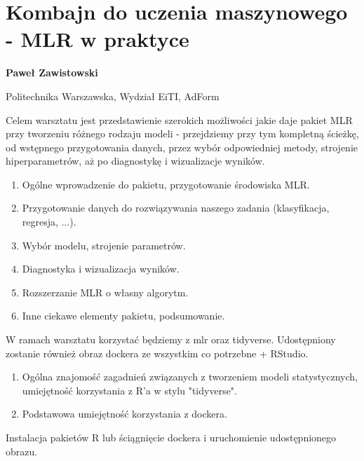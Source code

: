 \documentclass[\main/boa.tex]{subfiles}
\begin{document}
\section{Kombajn do uczenia maszynowego - MLR w praktyce}

\begin{minipage}{0.915\textwidth}
\centering
{\bf {} Paweł Zawistowski}
\end{minipage}

\vskip 0.3cm

\begin{affiliations}
\begin{minipage}{0.915\textwidth}
\centering
\large Politechnika Warszawska, Wydział EiTI, AdForm  \\[2pt]
\end{minipage}
\end{affiliations}

\vskip 0.8cm

\opiswarsztatu Celem warsztatu jest przedstawienie szerokich możliwości jakie daje pakiet MLR przy tworzeniu różnego rodzaju modeli - przejdziemy przy tym kompletną ścieżkę, od wstępnego przygotowania danych, przez wybór odpowiedniej metody, strojenie hiperparametrów, aż po diagnostykę i wizualizacje wyników.

\planwarsztatu
\begin{enumerate}
\item Ogólne wprowadzenie do pakietu, przygotowanie środowiska MLR.
\item Przygotowanie danych do rozwiązywania naszego zadania (klasyfikacja, regresja, ...).
\item Wybór modelu, strojenie parametrów.
\item Diagnostyka i wizualizacja wyników.
\item Rozszerzanie MLR o własny algorytm.
\item Inne ciekawe elementy pakietu, podsumowanie.
\end{enumerate}	 

\pakiety W ramach warsztatu korzystać będziemy z mlr oraz tidyverse. Udostępniony zostanie również obraz dockera ze wszystkim co potrzebne + RStudio.

\umiejetnosci\begin{enumerate}
	\item Ogólna znajomość zagadnień związanych z tworzeniem modeli statystycznych, umiejętność korzystania z R'a w stylu "tidyverse".
	\item Podstawowa umiejętność korzystania z dockera.
\end{enumerate}

\wymagania Instalacja pakietów R lub ściągnięcie dockera i uruchomienie udostępnionego obrazu.
\end{document}
